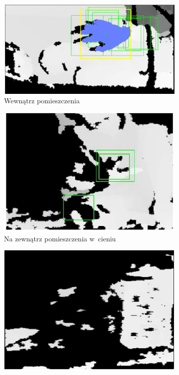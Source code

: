 \begin{figure}
	\centering
	\begin{subfigure}[b]{0.32\textwidth}
		\centering
		\includegraphics[width=\linewidth]{images/kinectIndoor.png}
		\caption{Wewnątrz pomieszczenia}
		\label{fig:characteristics:kinect:depthMapA}
	\end{subfigure}	
	\begin{subfigure}[b]{0.32\textwidth}
		\centering
		\includegraphics[width=\linewidth]{images/kinecOutdoorShade.png}
		\caption{Na zewnątrz pomieszczenia w~cieniu}
		\label{fig:characteristics:kinect:depthMapB}
	\end{subfigure}
	\begin{subfigure}[b]{0.32\textwidth}
		\centering
		\includegraphics[width=\linewidth]{images/kinecOutdoorFull.png}

\end{subfigure}
\end{figure}
